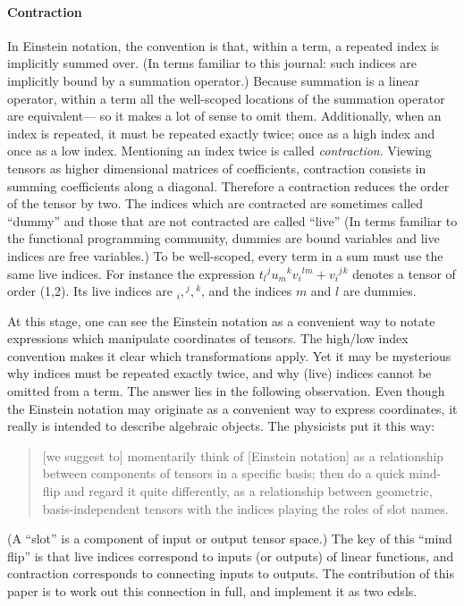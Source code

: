 \documentclass[nolinenum]{jfp}
\begin{document}
\paragraph*{Contraction}\hspace{1.0ex}\label{31} In Einstein notation, the convention is that, within a
term, a repeated index is implicitly summed over. (In terms familiar
to this journal: such indices are implicitly bound by a summation
operator.)  Because summation is a linear operator, within a term all the
well-scoped locations of the summation operator are equivalent--- so it
makes a lot of sense to omit them.
 Additionally, when an index is
repeated, it must be repeated exactly twice; once as a high index and
once as a low index. Mentioning an index twice is called
\emph{contraction}.  Viewing tensors as higher dimensional matrices of
coefficients, contraction consists in summing coefficients along a
diagonal.  Therefore a contraction reduces the order of the tensor by
two.  The indices which are contracted are sometimes called ``dummy''
and those that are not contracted are called ``live'' (In terms
familiar to the functional programming community, dummies
are bound variables and live indices are free variables.)  To be
well-scoped, every term in a sum must use the same live indices.  For
instance the expression \(t{_l}{^j}u{_m}{^k}v{_i}{^l}{^m} + v{_i}{^j}{^k}\) denotes a tensor of order
(1,2). Its live indices are \({}_i,{}^j,{}^k\), and the indices \(m\) and
\(l\) are dummies.

 
 
At this stage, one can see the Einstein notation as a convenient way
to notate expressions which manipulate coordinates of tensors. The
high/low index convention makes it clear which transformations
apply.  Yet it may be mysterious why indices must be repeated
exactly twice, and why (live) indices cannot be omitted from a term.
The answer lies in the following observation. Even though the Einstein notation may originate as a
convenient way to express coordinates, it really is intended to describe algebraic objects. The physicists
\citet{thorne15:ModernClassicalPhysics} put it this way: \begin{quote}[we suggest to]
momentarily think of [Einstein notation] as a relationship between components of
tensors in a specific basis; then do a quick mind-flip and regard it
quite differently, as a relationship between geometric,
basis-independent tensors with the indices playing the roles of slot
names.\end{quote} \noindent{} (A ``slot'' is a component of input or output tensor space.)
\noindent{} The key of this ``mind flip'' is that live indices correspond to
inputs (or outputs) of linear functions, and contraction corresponds
to connecting inputs to outputs.  The contribution of this paper is to
work out this connection in full, and implement it as two {\sc{}edsl}s.
\end{document}

